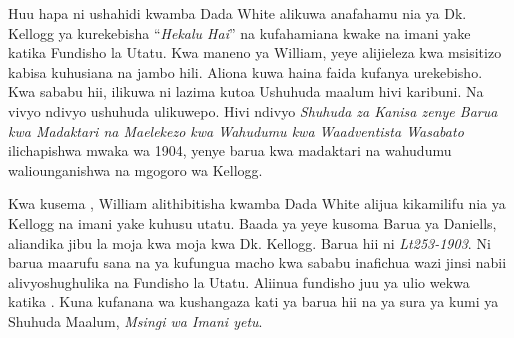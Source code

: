 Huu hapa ni ushahidi kwamba Dada White alikuwa anafahamu nia ya Dk. Kellogg ya kurekebisha “\textit{Hekalu Hai}” na kufahamiana kwake na imani yake katika Fundisho la Utatu. Kwa maneno ya William, yeye alijieleza kwa msisitizo kabisa kuhusiana na jambo hili. Aliona kuwa haina faida kufanya urekebisho. Kwa sababu hii, ilikuwa ni lazima kutoa Ushuhuda maalum hivi karibuni. Na vivyo ndivyo ushuhuda ulikuwepo. Hivi ndivyo \textit{Shuhuda za Kanisa zenye Barua kwa Madaktari na Maelekezo kwa Wahudumu kwa Waadventista Wasabato} ilichapishwa mwaka wa 1904, yenye barua kwa madaktari na wahudumu waliounganishwa na mgogoro wa Kellogg.

Kwa kusema , William alithibitisha kwamba Dada White alijua kikamilifu nia ya Kellogg na imani yake kuhusu utatu. Baada ya yeye kusoma Barua ya Daniells, aliandika jibu la moja kwa moja kwa Dk. Kellogg. Barua hii ni \textit{Lt253-1903}. Ni barua maarufu sana na ya kufungua macho kwa sababu inafichua wazi jinsi nabii alivyoshughulika na Fundisho la Utatu. Aliinua fundisho juu ya  ulio wekwa katika . Kuna kufanana wa kushangaza kati ya barua hii na ya sura ya kumi ya Shuhuda Maalum, \textit{Msingi wa Imani yetu}.


